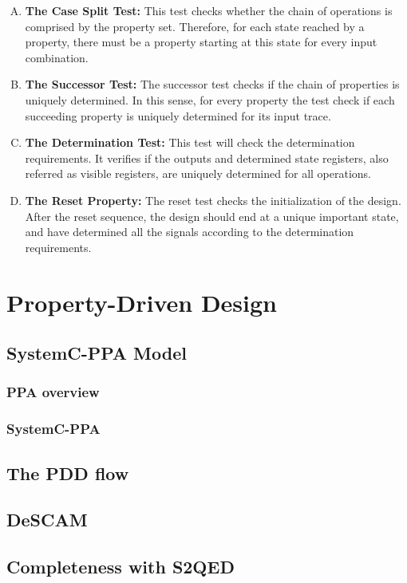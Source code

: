 \begin{enumerate}[A.]
    \item \textbf{The Case Split Test:} This test checks whether the chain of operations is comprised by the property set. Therefore, for each state reached by a property, there must be a property starting at this state for every input combination.
    \item \textbf{The Successor Test:} The successor test checks if the chain of properties is uniquely determined. In this sense, for every property the test check if each succeeding property is uniquely determined for its input trace.
    \item \textbf{The Determination Test:} This test will check the determination requirements. It verifies if the outputs and determined state registers, also referred as visible registers, are uniquely determined for all operations.
    \item \textbf{The Reset Property:} The reset test checks the initialization of the design. After the reset sequence, the design should end at a unique important state, and have determined all the signals according to the determination requirements.
\end{enumerate}


\section{Property-Driven Design}

\subsection{SystemC-PPA Model}

\subsubsection{PPA overview}

\subsubsection{SystemC-PPA}

\subsection{The PDD flow}

\subsection{DeSCAM}

\subsection{Completeness with S2QED}


